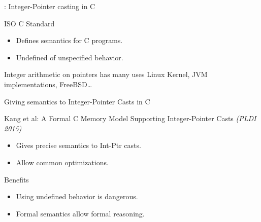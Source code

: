 \begin{frame}[fragile]{\secname : Integer-Pointer casting in C}

  \begin{minipage}{0.48\textwidth}
    
  \end{minipage}
  \begin{minipage}{0.48\textwidth}
  \begin{alertblock}{ISO C Standard}
    \begin{itemize}
    \item Defines semantics for C programs.
    \item Undefined of unspecified behavior.
    \end{itemize}
  \end{alertblock}
  \end{minipage}
  \vfill
  \begin{exampleblock}{Integer arithmetic on pointers has many uses}
    Linux Kernel, JVM implementations, FreeBSD\dots
  \end{exampleblock}
  
\end{frame}

\begin{frame}{Giving semantics to Integer-Pointer Casts in C}

  \begin{block}{Kang et al: A Formal C Memory Model Supporting Integer-Pointer Casts \textit{(PLDI 2015)}}
    \begin{itemize}
    \item Gives precise semantics to Int-Ptr casts.
    \item Allow common optimizations.
    \end{itemize}
  \end{block}
  \vfill
  \begin{exampleblock}{Benefits}
    \begin{itemize}
    \item Using undefined behavior is dangerous.
    \item Formal semantics allow formal reasoning.
    \end{itemize}
  \end{exampleblock}


\end{frame}


